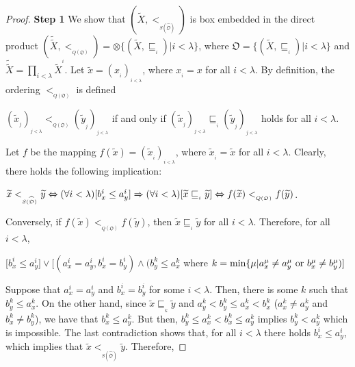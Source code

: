 \documentclass{article}
\theoremstyle{definition}
\begin{document}
\begin{proof}{\bf Step 1}
We show that $(\widetilde{X},<_{_{S(\widehat{\mathfrak{O}})}})$ 
is box embedded in the direct product
$(\widetilde{\widetilde{X}},<_{_{Q(\mathfrak{O})}})=\otimes\{(\widetilde{X},\sqsubseteq_{_i})\vert i<\lambda\}$,
where $\mathfrak{O}=\{(\widetilde{X},\sqsubseteq_{_i})\vert i<\lambda\}$ and $\widetilde{\widetilde{X}}=
\displaystyle\prod_{i<\lambda}\widetilde{X}^{^i}$. Let $\widetilde{x}=(x_{_i})_{_{i<\lambda}}$,
where $x_{_i}=x$ for all $i<\lambda$.
By definition, the ordering $<_{_{Q(\mathfrak{O})}}$ is defined
\begin{center}
$(\widetilde{x}_{_j})_{_{j<\lambda}}<_{_{Q(\mathfrak{O})}}(\widetilde{y}_{_j})_{_{j<\lambda}}$
if and only if $(\widetilde{x}_{_j})_{_{j<\lambda}} \sqsubseteq_{_i}(\widetilde{y}_{_j})_{_{j<\lambda}}$
holds for all $i<\lambda$.
\end{center}
Let $f$ be the mapping
$f(\widetilde{x})=(\widetilde{x}_{_i})_{_{i<\lambda}}$,
where
$\widetilde{x}_{_i}=\widetilde{x}$
for all $i<\lambda$.
Clearly, there holds the following implication:
\begin{center}
$\widetilde{x} <_{_{S(\widehat{\mathfrak{O}})}}\widetilde{y}
\Leftrightarrow
{\rm (}\forall i<\lambda{\rm )}[b_{x}^{i}\leq a_{y}^{i}]
\Rightarrow {\rm (}\forall i<\lambda{\rm )}[\widetilde{x}\sqsubseteq_{_i}\widetilde{y}]
\Leftrightarrow f(\widetilde{x})<_{_{Q(\mathfrak{O})}} f(\widetilde{y})$.
\end{center}
Conversely, if $f(\widetilde{x})<_{_{Q(\mathfrak{O})}} f(\widetilde{y})$, then 
$\widetilde{x}\sqsubseteq_{_i}\widetilde{y}$ for all
$i<\lambda$. Therefore, for all $i<\lambda$,
\begin{center}
[$b_{x}^{i}\leq a_{y}^{i}] \vee [(a_{x}^{i}=a_{y}^{i}, b_{x}^{i}=b_{y}^{i})\wedge  (b_{y}^{k}\leq a_{x}^{k}$
where $k=\min\{\mu\vert a_{x}^{\mu}\neq a_{y}^{\mu}\ {\rm or}\ b_{x}^{\mu}\neq b_{y}^{\mu})]$
\end{center}
Suppose that $a_{x}^{i}=a_{y}^{i}$ and $b_{x}^{i}=b_{y}^{i}$ for some $i<\lambda$. Then,
there is some $k$ such that 
$b_{y}^{k}\leq a_{x}^{k}$. On the other hand, since $\widetilde{x}\sqsubseteq_{_k}\widetilde{y}$
and $a_{y}^{k}<b_{y}^{k}\leq a_{x}^{k}<b_{x}^{k}$ ($a_{x}^{k}\neq a_{y}^{k}$ and $b_{x}^{k}\neq b_{y}^{k}$),
we have that $b_{x}^{k}\leq a_{y}^{k}$. But then, $b_{y}^{k}\leq a_{x}^{k}<b_{x}^{k}\leq a_{y}^{k}$
implies $b_{y}^{k}< a_{y}^{k}$ which is impossible.
The last contradiction shows that,
for all $i<\lambda$ there holds
$b_{x}^{i}\leq a_{y}^{i}$, which implies that 
$\widetilde{x} <_{_{S(\widehat{\mathfrak{O}})}}\widetilde{y}$.
Therefore,

\end{proof}
\end{document}
